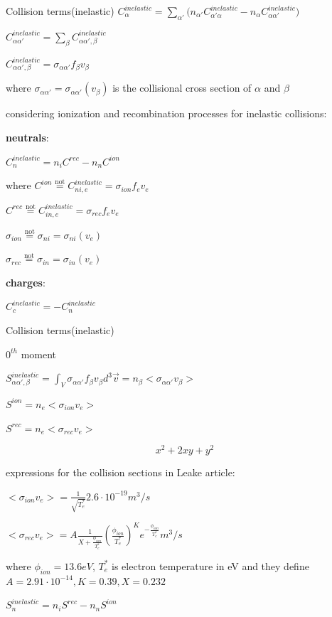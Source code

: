 \documentclass{beamer}
\begin{document}
\begin{frame}{Collision terms(inelastic) }
$C_{\alpha}^{inelastic} = \sum_{\alpha'} {(n_{\alpha'} C_{\alpha'\alpha}^{inelastic} - n_{\alpha} C_{\alpha\alpha'}^{inelastic}}) $

$C_{\alpha\alpha'}^{inelastic} =  \sum_{\beta} {C_{\alpha\alpha',\beta}^{inelastic}  }$

$C_{\alpha\alpha',\beta}^{inelastic} =  \sigma_{\alpha \alpha'} f_{\beta} v_{\beta} $  

where $\sigma_{\alpha \alpha'} = \sigma_{\alpha \alpha'}(v_{\beta}) $  is the collisional cross section of $\alpha$ and $\beta$ 

considering ionization and recombination processes for inelastic collisions:

\textbf{neutrals}:

$C_n^{inelastic} = n_i C^{rec} - n_n C^{ion}$ 

where $C^{ion} \stackrel{\text{not}}{=} C_{ni,e}^{inelastic} = \sigma_{ion} f_e v_e$

$C^{rec} \stackrel{\text{not}}{=} C_{in,e}^{inelastic} = \sigma_{rec} f_e v_e $

$\sigma_{ion}  \stackrel{\text{not}}{=}  \sigma_{ni}= \sigma_{ni} (v_e) $

$\sigma_{rec}  \stackrel{\text{not}}{=}   \sigma_{in}= \sigma_{in} (v_e) $

\textbf{charges}:

$C_c^{inelastic} = -C_n^{inelastic}$ 

\end{frame}


\begin{frame}{Collision terms(inelastic) }

{\color{red} $0^{th}$ moment}

$S_{\alpha\alpha',\beta}^{inelastic} = \int_V{\sigma_{\alpha \alpha'} f_{\beta} v_{\beta} d^3\vec{v} } = n_{\beta} <\sigma_{\alpha \alpha'} v_{\beta} >$  


$S^{ion} = n_e <\sigma_{ion} v_e >$ 

$S^{rec} = n_e <\sigma_{rec} v_e >$


\begin{small}
\[ x^2 + 2xy + y^2 \]
\end{small}

expressions for the collision sections in Leake article:

$<\sigma_{ion} v_e > = \frac{1}{\sqrt{T_e^*}}	2.6 \cdot 10^{-19} m^3/s$

$<\sigma_{rec} v_e > = A \frac{1}{X + \frac{\phi_{ion}}{T_e^*}}	(\frac{\phi_{ion}}{T_e^*})^K  e^{-\frac{\phi_{ion}}{T_e^*} } m^3/s$

where $\phi_{ion} = 13.6 eV$, $T_e^*$ is electron temperature in eV and  they define $A = 2.91 \cdot 10^{-14}, K = 0.39, X = 0.232$


$S_n^{inelastic} = n_i S^{rec} - n_n S^{ion}  $ 




\end{frame}
\end{document}
